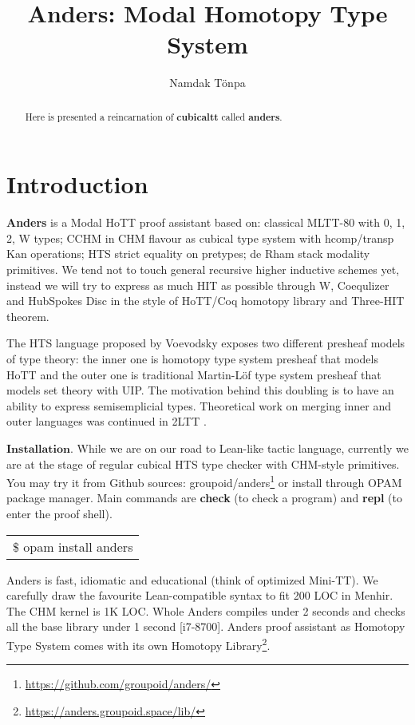 \documentclass[a4paper,UKenglish,cleveref, autoref, thm-restate]{lipics-v2021}
\title{Anders: Modal Homotopy Type System}
\author{Namdak Tönpa}{Groupoid Infinity}{maxim@synrc.com}{https://orcid.org/0000-0001-7127-8796}{}
\begin{document}
\maketitle

\begin{abstract}
Here is presented a reincarnation of \textbf{cubicaltt} called \textbf{anders}.
\end{abstract}

\section{Introduction}
\label{sec:typesetting-summary}

\textbf{Anders} is a Modal HoTT proof assistant based on: classical MLTT-80 \cite{MLTT80}
with 0, 1, 2, W types; CCHM \cite{CCHM} in CHM \cite{CHM} flavour as cubical type system with
hcomp/transp Kan operations; HTS \cite{HTS} strict equality on pretypes; de Rham \cite{deRham}
stack modality primitives. We tend not to touch general recursive higher inductive schemes yet,
instead we will try to express as much HIT as possible through W, Coequlizer and HubSpokes
Disc in the style of HoTT/Coq homotopy library and Three-HIT theorem.

The HTS language proposed by Voevodsky exposes two different presheaf models of type theory:
the inner one is homotopy type system presheaf that models HoTT and the outer one is
traditional Martin-Löf type system presheaf that models set theory with UIP.
The motivation behind this doubling is to have an ability to express semisemplicial types.
Theoretical work on merging inner and outer languages was continued in 2LTT \cite{2LTT}.

$\mathbf{Installation}$. While we are on our road to Lean-like tactic language, currently we are at the stage of
regular cubical HTS type checker with CHM-style primitives. You may try it from Github
sources: groupoid/anders\footnote{\url{https://github.com/groupoid/anders/}} or install
through OPAM package manager. Main commands are \textbf{check} (to check a program)
and \textbf{repl} (to enter the proof shell).

\begin{table}[ht]
\centering
\begin{tabular}{l}
\$ opam install anders
\end{tabular}
\end{table}

Anders is fast, idiomatic and educational (think of optimized Mini-TT). We carefully draw the favourite Lean-compatible
syntax to fit 200 LOC in Menhir. The CHM kernel is 1K LOC. Whole Anders compiles under 2
seconds and checks all the base library under 1 second [i7-8700]. Anders proof assistant
as Homotopy Type System comes with its own Homotopy Library\footnote{\url{https://anders.groupoid.space/lib/}}.
\end{document}

